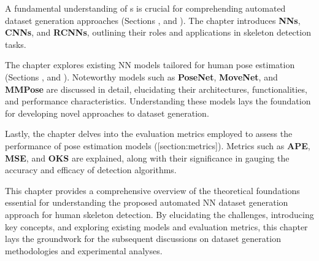 A fundamental understanding of \NN\-s is crucial for comprehending automated dataset generation approaches (Sections \in[section:nn],  and ). The chapter introduces {\bf NNs}, {\bf CNNs}, and {\bf RCNNs}, outlining their roles and applications in skeleton detection tasks.


The chapter explores existing NN models tailored for human pose estimation (Sections ,  and ). Noteworthy models such as {\bf PoseNet}, {\bf MoveNet}, and {\bf MMPose} are discussed in detail, elucidating their architectures, functionalities, and performance characteristics. Understanding these models lays the foundation for developing novel approaches to dataset generation.


Lastly, the chapter delves into the evaluation metrics employed to assess the performance of pose estimation models ([section:metrics]). Metrics such as {\bf APE}, {\bf MSE}, and {\bf OKS} are explained, along with their significance in gauging the accuracy and efficacy of detection algorithms.

This chapter provides a comprehensive overview of the theoretical foundations essential for understanding the proposed automated NN dataset generation approach for human skeleton detection. By elucidating the challenges, introducing key concepts, and exploring existing models and evaluation metrics, this chapter lays the groundwork for the subsequent discussions on dataset generation methodologies and experimental analyses.